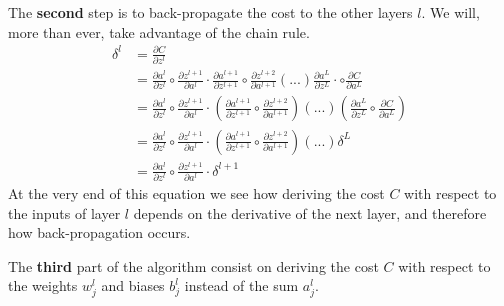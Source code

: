 			The \textbf{second} step is to back-propagate the cost to the other layers $l$. We will, more than ever, take advantage of the chain rule.
			\begin{equation}
				\begin{split}
					\delta^l
					&= \frac{\partial C}{\partial z^l } \\
					&=	\frac{\partial a^l }{\partial z^l }  		\circ\frac{\partial z^{l+1} }{\partial a^l } \cdot
					\frac{\partial a^{l+1} }{\partial z^{l+1} }  	\circ\frac{\partial z^{l+2}}{\partial a^{l+1} }  (...)
					\frac{\partial a^L }{\partial z^L } \cdot  		\circ\frac{\partial C}{\partial a^L } \\
					&=  \frac{\partial a^l }{\partial z^l }  		\circ\frac{\partial z^{l+1} }{\partial a^l }  \cdot
						\left( \frac{\partial a^{l+1} }{\partial z^{l+1} }  \circ\frac{\partial z^{l+2}}{\partial a^{l+1} }\right) (...)
						\left( \frac{\partial a^L }{\partial z^L }  		\circ\frac{\partial C}{\partial a^L }\right) \\
					&= 	\frac{\partial a^l }{\partial z^l }   				\circ\frac{\partial z^{l+1} }{\partial a^l } \cdot
						\left( \frac{\partial a^{l+1} }{\partial z^{l+1} }  \circ\frac{\partial z^{l+2}}{\partial a^{l+1} }\right) (...) 
						\delta^{L}\\
					&= 	\frac{\partial a^l }{\partial z^l }  		\circ\frac{\partial z^{l+1} }{\partial a^l } \cdot
						\delta^{l+1}
				\end{split}
			\end{equation}
			At the very end of this equation we see how deriving the cost $C$ with respect to the inputs of layer $l$ depends on the derivative of the next layer, and therefore how back-propagation occurs.

			The \textbf{third} part of the algorithm consist on deriving the cost $C$ with respect to the weights $w^l_j$ and biases $b^l_j$ instead of the sum $a^l_j$.

